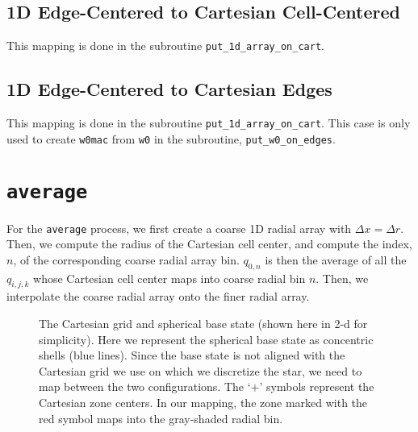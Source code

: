 \subsection{1D Edge-Centered to Cartesian Cell-Centered}
This mapping is done in the subroutine {\tt put\_1d\_array\_on\_cart}.
\subsection{1D Edge-Centered to Cartesian Edges}
This mapping is done in the subroutine {\tt put\_1d\_array\_on\_cart}.
This case is only used to create {\tt w0mac} from {\tt w0} in the 
subroutine, {\tt put\_w0\_on\_edges}.
\section{\tt average}
For the {\tt average} process, we first create a coarse 1D radial array 
with $\Delta x = \Delta r$.  Then, we compute the radius of the Cartesian cell 
center, and compute the index, $n$, of the corresponding coarse radial 
array bin.  $q_{0,n}$ is then the average of all the $q_{i,j,k}$ whose 
Cartesian cell center maps into coarse radial bin $n$.  Then, we 
interpolate the coarse radial array onto the finer radial array.

\clearpage

\begin{figure}[tpb]
\begin{center}
\caption{\label{fig:mapping} The Cartesian grid and spherical base
state (shown here in 2-d for simplicity).  Here we represent the
spherical base state as concentric shells (blue lines).  Since the
base state is not aligned with the Cartesian grid we use on which
we discretize the star, we need to map between the two configurations.
The `$+$' symbols represent the Cartesian zone centers.  In our
mapping, the zone marked with the red symbol maps into the gray-shaded
radial bin. }
\label{fig:mapping}
\end{center}
\end{figure}
